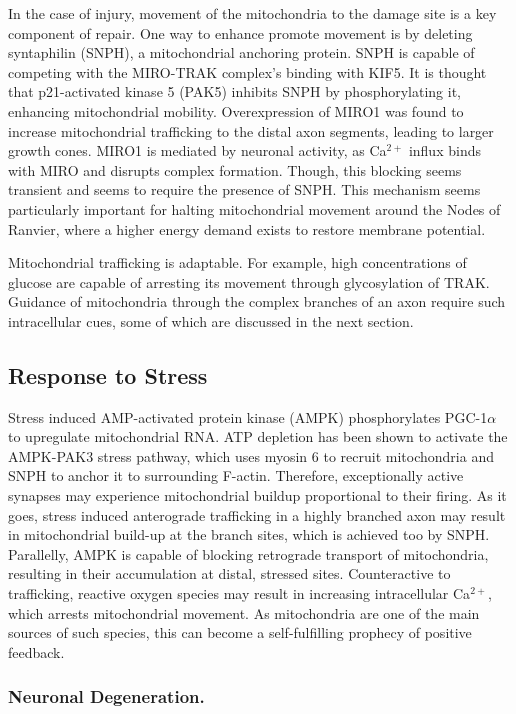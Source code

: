 \documentclass[12pt]{report}
\begin{document}
In the case of injury, movement of the mitochondria to the damage site is a key component of repair. One way to enhance promote movement is by deleting syntaphilin (SNPH), a mitochondrial anchoring protein. SNPH is capable of competing with the MIRO-TRAK complex's binding with KIF5. It is thought that p21-activated kinase 5 (PAK5) inhibits SNPH by phosphorylating it, enhancing mitochondrial mobility. Overexpression of MIRO1 was found to increase mitochondrial trafficking to the distal axon segments, leading to larger growth cones. MIRO1 is mediated by neuronal activity, as Ca$^{2+}$ influx binds with MIRO and disrupts complex formation. Though, this blocking seems transient and seems to require the presence of SNPH. This mechanism seems particularly important for halting mitochondrial movement around the Nodes of Ranvier, where a higher energy demand exists to restore membrane potential.\newline

Mitochondrial trafficking is adaptable. For example, high concentrations of glucose are capable of arresting its movement through glycosylation of TRAK. Guidance of mitochondria through the complex branches of an axon require such intracellular cues, some of which are discussed in the next section.  

\subsection{Response to Stress}

Stress induced AMP-activated protein kinase (AMPK) phosphorylates PGC-1$\alpha$ to upregulate mitochondrial RNA. ATP depletion has been shown to activate the AMPK-PAK3 stress pathway, which uses myosin 6 to recruit mitochondria and SNPH to anchor it to surrounding F-actin. Therefore, exceptionally active synapses may experience mitochondrial buildup proportional to their firing. As it goes, stress induced anterograde trafficking in a highly branched axon may result in mitochondrial build-up at the branch sites, which is achieved too by SNPH. Parallelly, AMPK is capable of blocking retrograde transport of mitochondria, resulting in their accumulation at distal, stressed sites. Counteractive to trafficking, reactive oxygen species may result in increasing intracellular Ca$^{2+}$, which arrests mitochondrial movement. As mitochondria are one of the main sources of such species, this can become a self-fulfilling prophecy of positive feedback.

\subsubsection{Neuronal Degeneration.}
\end{document}
